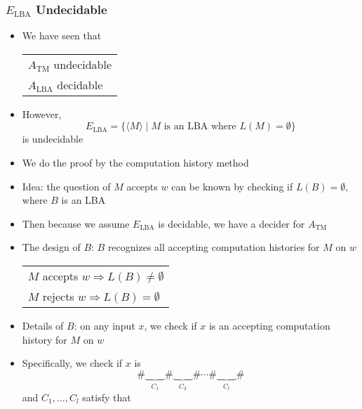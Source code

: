 





\begin{frame}[allowframebreaks]
\frametitle{$E_{\text{LBA}}$ Undecidable}
\begin{itemize}
\item We have seen that
  \begin{center}
    \begin{tabular}{l}
      $A_{\text{TM}}$ undecidable \\
      $A_{\text{LBA}}$ decidable 
    \end{tabular}
  \end{center}
\item However,
    \begin{equation*}
  E_{\text{LBA}}=
\{\langle  M\rangle\mid M \mbox{ is an LBA where } L(M) = \emptyset\}
\end{equation*}
is undecidable
\item We do the proof by the computation history method
\item Idea: the question of $M$ accepts $w$ can be known by
  checking if $L(B) = \emptyset$, where $B$ is an LBA
\item Then because we assume $E_{\text{LBA}}$ is decidable, we have a decider
  for $A_{\text{TM}}$
\item The design of $B$: $B$ recognizes all accepting computation
  histories for $M$ on $w$
  \begin{center}
    \begin{tabular}{l}
      $M$ accepts $w \Rightarrow L(B) \neq \emptyset$\\
      $M$ rejects $w \Rightarrow L(B) = \emptyset$
    \end{tabular}
  \end{center}
\item Details of $B$: on any input $x$, we check if $x$ is an
  accepting computation history for $M$ on $w$
\item Specifically, we check if $x$ is
  \begin{equation*}
    \#\underbrace{\qquad}_{C_1}\#\underbrace{\qquad}_{C_2}\#\cdots\#\underbrace{\qquad}_{C_l}\#
  \end{equation*}
  and $C_1, \ldots, C_l$ satisfy that
  \begin{center}

\end{center}
\end{itemize}
\end{frame}
